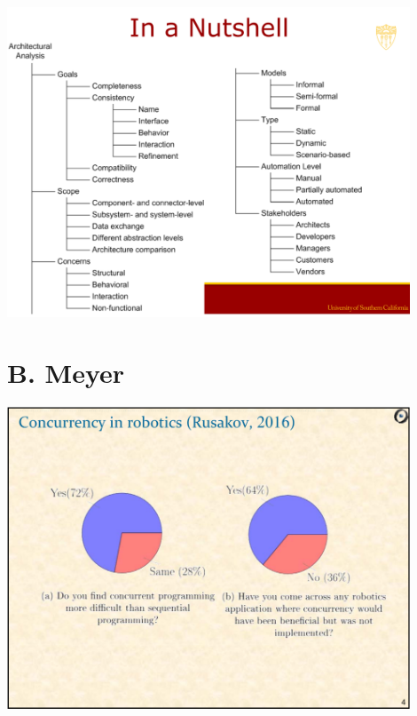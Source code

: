\documentclass[xetex,mathserif,serif]{beamer}
\begin{document}
	\begin{frame}
		\begin{center}
			\includegraphics[width=0.9\textwidth]{medvidovic13.png}
		\end{center}
	\end{frame}

	\section{B. Meyer}

	\begin{frame}
		\begin{center}
			\includegraphics[width=0.9\textwidth]{meyer1.png}
		\end{center}
	\end{frame}
\end{document}

